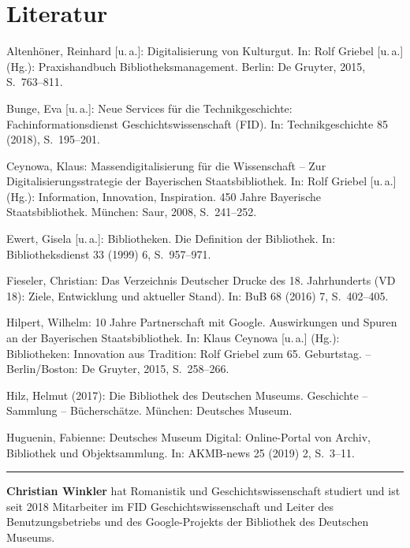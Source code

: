 \documentclass[a4paper,
fontsize=11pt,
oneside,
numbers=noperiodatend,
parskip=half-,
bibliography=totoc,
final
]{scrartcl}
\begin{document}
\hypertarget{literatur}{%
\section{Literatur}\label{literatur}}

Altenhöner, Reinhard {[}u.\,a.{]}: Digitalisierung von Kulturgut. In:
   Rolf Griebel {[}u.\,a.{]} (Hg.): Praxishandbuch
  Bibliotheksmanagement.  Berlin: De Gruyter, 2015, S.~763--811.

  Bunge, Eva {[}u.\,a.{]}: Neue Services für die Technikgeschichte:
   Fachinformationsdienst Geschichtswissenschaft (FID).
  In:  Technikgeschichte 85 (2018), S.~195--201.

  Ceynowa, Klaus: Massendigitalisierung für die Wissenschaft -- Zur
   Digitalisierungsstrategie der Bayerischen
  Staatsbibliothek. In:  Rolf Griebel {[}u.\,a.{]} (Hg.):
  Information, Innovation, Inspiration.  450 Jahre
  Bayerische Staatsbibliothek. München: Saur, 2008, S.~241--252.

  Ewert, Gisela {[}u.\,a.{]}: Bibliotheken. Die Definition der Bibliothek.
   In: Bibliotheksdienst 33 (1999) 6, S.~957--971.

  Fieseler, Christian: Das Verzeichnis Deutscher Drucke des 18.
   Jahrhunderts (VD 18): Ziele, Entwicklung und aktueller
  Stand). In: BuB 68 (2016) 7, S.~402--405.

  Hilpert, Wilhelm: 10 Jahre Partnerschaft mit Google. Auswirkungen
   und Spuren an der Bayerischen Staatsbibliothek. In:
  Klaus  Ceynowa {[}u.\,a.{]} (Hg.): Bibliotheken:
  Innovation aus Tradition:  Rolf Griebel zum 65.
  Geburtstag. -- Berlin/Boston: De Gruyter,  2015, S.~258--266.

  Hilz, Helmut (2017): Die Bibliothek des Deutschen Museums.
   Geschichte -- Sammlung -- Bücherschätze. München:
  Deutsches  Museum.

  Huguenin, Fabienne: Deutsches Museum Digital: Online-Portal von
   Archiv, Bibliothek und Objektsammlung. In: AKMB-news
  25 (2019)  2, S.~3--11.


\begin{center}\rule{0.5\linewidth}{0.5pt}\end{center}

\textbf{Christian Winkler} hat Romanistik und Geschichtswissenschaft
studiert und ist seit 2018 Mitarbeiter im FID Geschichtswissenschaft und
Leiter des Benutzungsbetriebs und des Google-Projekts der Bibliothek des
Deutschen Museums.
\end{document}
